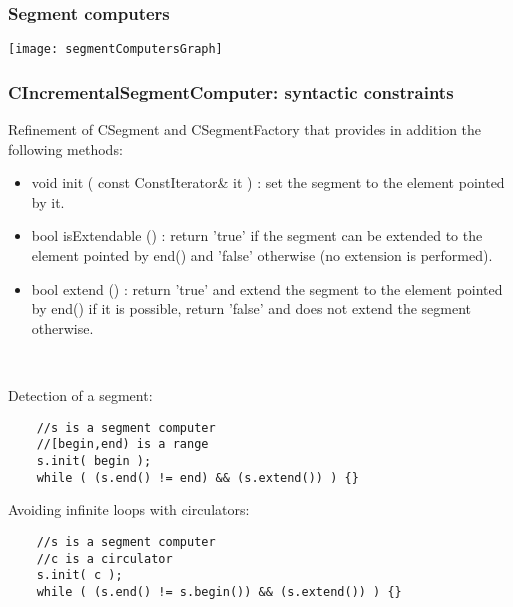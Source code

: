 \begin{frame}
  \frametitle{Segment computers}
 

 \begin{center}
   \texttt{[image: segmentComputersGraph]}
 \end{center}

\end{frame}

\begin{frame}
  \frametitle{CIncrementalSegmentComputer: syntactic constraints}

Refinement of CSegment and CSegmentFactory that provides in addition the following methods:
\begin{itemize}
 \item void init ( const ConstIterator\& it ) : set the segment to the element pointed by it.
 \item bool isExtendable () : return 'true' if the segment can be extended to the element pointed by end() and 'false' otherwise (no extension is performed).
 \item bool extend () : return 'true' and extend the segment to the element pointed by end() if it is possible, return 'false' and does not extend the segment otherwise.
\end{itemize}

~

Detection of a segment:
  \begin{lstlisting}
    //s is a segment computer
    //[begin,end) is a range
    s.init( begin );
    while ( (s.end() != end) && (s.extend()) ) {} 
  \end{lstlisting}

Avoiding infinite loops with circulators:
  \begin{lstlisting}
    //s is a segment computer
    //c is a circulator
    s.init( c );
    while ( (s.end() != s.begin()) && (s.extend()) ) {}
  \end{lstlisting}

\end{frame}

